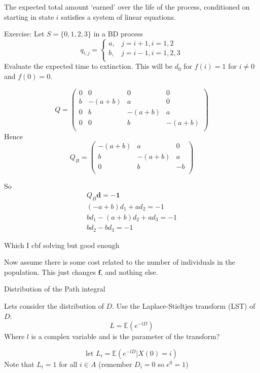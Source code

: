 \documentclass{X:/Documents/Coding/Latex/myassignment}
\begin{document}
The expected total amount `earned' over the life of the process, conditioned on starting in state $i$ satisfies a system of linear equations.  


Exercise: Let $S = \{0,1,2,3\}$ in a BD process
\[q_{i,j} = \begin{cases}
a,& j=i+1, i=1,2\\
b,& j=i-1, i=1,2,3\\
\end{cases}\]
Evaluate the expected time to extinction.
This will be $d_0$ for $f(i) = 1$ for $i\neq 0$ and $f(0) = 0$.

\[Q = \begin{pmatrix}
    0&0&0&0\\
    b & -(a+b) & a & 0\\
    0&b & -(a+b) & a\\
    0&0&b & -(a+b)\\
\end{pmatrix}\]
Hence
\[Q_B = \begin{pmatrix}
    -(a+b) & a & 0\\
    b & -(a+b) & a\\
    0&b & -b\\
\end{pmatrix}\]


So
\begin{align*}
    Q_B \mathbf{d} = -\mathbf{1}\\
    (-a+b) d_1 + ad_2 = -1\\
    b d_1 - (a+b) d_2 + ad_3 = -1\\
    bd_2 - bd_3 = -1
\end{align*}

Which I cbf solving but good enough

Now assume there is some cost related to the number of individuals in the population. This just changes $\mathbf{f}$, and nothing else.


Distribution of the Path integral


Lets consider the distribution of $D$. Use the Laplace-Stieltjes transform (LST) of $D$:
\[L = \mathbb{E}\left(e^{-lD}\right)\] 
Where $l$ is a complex variable and is the parameter of the transform?

\[\text{let  } L_i = \mathbb{E}\left(e^{-lD} | X(0) = i\right)\]
Note that $L_i = 1$ for all $i \in A$ (remember $D_i = 0$ so $e^{0} = 1$)
\end{document}
